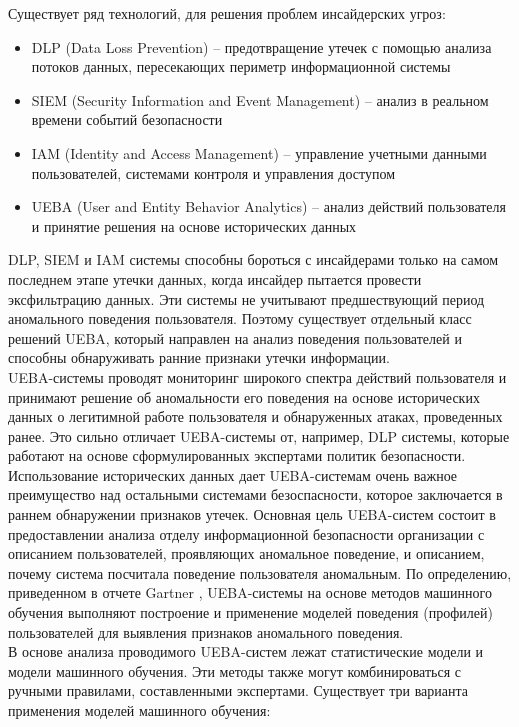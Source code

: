 Существует ряд технологий, для решения проблем инсайдерских угроз:\\
\begin{itemize}
	\item DLP (Data Loss Prevention) – предотвращение утечек с помощью анализа потоков данных, пересекающих периметр информационной системы
	\item SIEM (Security Information and Event Management) – анализ в реальном времени событий безопасности
	\item IAM (Identity and Access Management) – управление учетными данными пользователей, системами контроля и управления доступом
	\item UEBA (User and Entity Behavior Analytics) – анализ действий пользователя и принятие решения на основе исторических данных
\end{itemize}

DLP, SIEM и IAM системы способны бороться с инсайдерами только на самом последнем этапе утечки данных, когда инсайдер пытается провести эксфильтрацию данных. Эти системы не учитывают предшествующий период аномального поведения пользователя. Поэтому существует отдельный класс решений UEBA, который направлен на анализ поведения пользователей и способны обнаруживать ранние признаки утечки информации.\\

UEBA-системы проводят мониторинг широкого спектра действий пользователя и принимают решение об аномальности его поведения на основе исторических данных о легитимной работе пользователя и обнаруженных атаках, проведенных ранее. Это сильно отличает UEBA-системы от, например, DLP системы, которые работают на основе сформулированных экспертами политик безопасности. Использование исторических данных дает UEBA-системам очень важное преимущество над остальными системами безоспасности, которое заключается в раннем обнаружении признаков утечек. Основная цель UEBA-систем состоит в предоставлении анализа отделу информационной безопасности организации с описанием пользователей, проявляющих аномальное поведение, и описанием, почему система посчитала поведение пользователя аномальным. По определению, приведенном в отчете  Gartner \cite{GartnerReportMarket2019}, UEBA-системы на основе методов машинного обучения выполняют построение и применение моделей поведения (профилей) пользователей для выявления признаков аномального поведения.\\

В основе анализа проводимого UEBA-систем лежат статистические модели и модели машинного обучения. Эти методы также могут комбинироваться с ручными правилами, составленными экспертами. Существует три варианта применения моделей машинного обучения:\\

